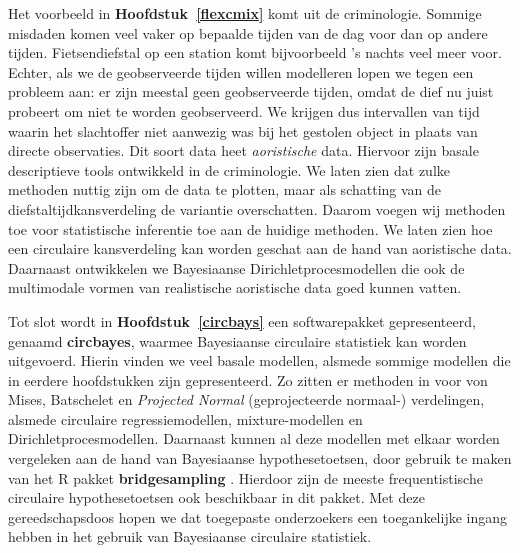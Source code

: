 \documentclass[12pt, a4paper]{book}\usepackage[]{graphicx}\usepackage[]{color}
\let\proglang=\textsf
\newcommand{\pkg}[1]{\textbf{#1}}
\begin{document}
Het voorbeeld in \textbf{Hoofdstuk~\ref{flexcmix}} komt uit de criminologie. Sommige misdaden komen veel vaker op bepaalde tijden van de dag voor dan op andere tijden. Fietsendiefstal op een station komt bijvoorbeeld 's nachts veel meer voor. Echter, als we de geobserveerde tijden willen modelleren lopen we tegen een probleem aan: er zijn meestal geen geobserveerde tijden, omdat de dief nu juist probeert om niet te worden geobserveerd. We krijgen dus intervallen van tijd waarin het slachtoffer niet aanwezig was bij het gestolen object in plaats van directe observaties. Dit soort data heet \textit{aoristische} data. Hiervoor zijn basale descriptieve tools ontwikkeld \citep{ashby2013comparison} in de criminologie. We laten zien dat zulke methoden nuttig zijn om de data te plotten, maar als schatting van de diefstaltijdkansverdeling de variantie overschatten. Daarom voegen wij methoden toe voor statistische inferentie toe aan de huidige methoden. We laten zien hoe een circulaire kansverdeling kan worden geschat aan de hand van aoristische data. Daarnaast ontwikkelen we Bayesiaanse Dirichletprocesmodellen die ook de multimodale vormen van realistische aoristische data goed kunnen vatten.

Tot slot wordt in \textbf{Hoofdstuk~\ref{circbays}} een softwarepakket gepresenteerd, genaamd \pkg{circbayes}, waarmee Bayesiaanse circulaire statistiek kan worden uitgevoerd. Hierin vinden we veel basale modellen, alsmede sommige modellen die in eerdere hoofdstukken zijn gepresenteerd. Zo zitten er methoden in voor von Mises, Batschelet en \textit{Projected Normal} (geprojecteerde normaal-) verdelingen, alsmede circulaire regressiemodellen, mixture-modellen en Dirichletprocesmodellen. Daarnaast kunnen al deze modellen met elkaar worden vergeleken aan de hand van Bayesiaanse hypothesetoetsen, door gebruik te maken van het \proglang{R} pakket \pkg{bridgesampling} \citep{gronau2017bridgesampling}. Hierdoor zijn de meeste frequentistische circulaire hypothesetoetsen ook beschikbaar in dit pakket. Met deze gereedschapsdoos hopen we dat toegepaste onderzoekers een toegankelijke ingang hebben in het gebruik van Bayesiaanse circulaire statistiek.




\end{document}

